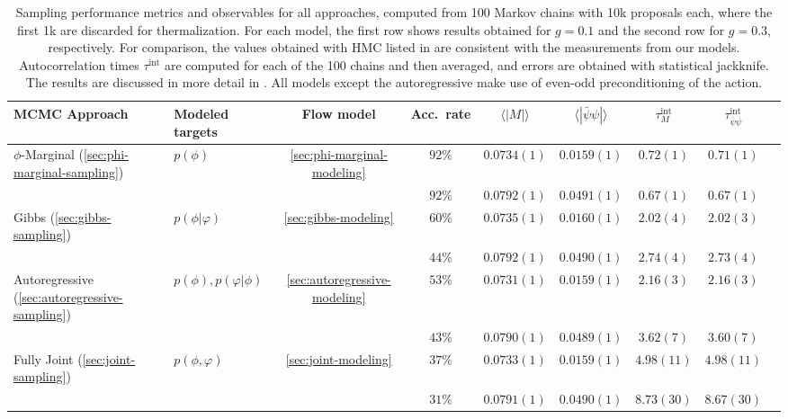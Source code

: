 \documentclass[aps,prd,twocolumn,nofootinbib,superscriptaddress,preprintnumbers]{revtex4-1}
\begin{document}
\begin{table}
    \centering
    \begin{ruledtabular}
    \begin{tabular}{m{1.3in}>{\centering\arraybackslash}p{1.0in}ccccccc}
         MCMC Approach & Modeled targets & Flow model & Acc.\ rate & $\langle|M|\rangle$ & $\langle|\bar\psi \psi|\rangle$ & $\tau^{\text{int}}_{M}$ & $\tau^{\text{int}}_{\bar{\psi} \psi}$ \\
    \midrule
         $\phi$-Marginal (\ref{sec:phi-marginal-sampling}) & $p(\phi)$ & \ref{sec:phi-marginal-modeling} & $92\%$ & $0.0734(1)$ & $0.0159(1)$ & $0.72(1)$ & $0.71(1)$ \\
         & & & $92\%$ & $0.0792(1)$ & $0.0491(1)$ & $0.67(1)$ & $0.67(1)$ \\ \vspace{1ex}
         Gibbs (\ref{sec:gibbs-sampling}) & $p(\phi|\varphi)$ & \ref{sec:gibbs-modeling} & $60\%$ & $0.0735(1)$ & $0.0160(1)$ & $2.02(4)$ & $2.02(3)$ \\
         & & & $44\%$ & $0.0792(1)$ & $0.0490(1)$ & $2.74(4)$ & $2.73(4)$ \\ \vspace{1ex}
         Autoregressive (\ref{sec:autoregressive-sampling}) & $p(\phi), p(\varphi|\phi)$ & \ref{sec:autoregressive-modeling} & $53\%$ & $0.0731(1)$ & $0.0159(1)$ & $2.16(3)$ & $2.16(3)$  \\
         & & & $43\%$ & $0.0790(1)$ & $0.0489(1)$ & $3.62(7)$ & $3.60(7)$ \\ \vspace{1ex}
         Fully Joint (\ref{sec:joint-sampling}) & $p(\phi,\varphi)$ & \ref{sec:joint-modeling} & $37\%$ & $0.0733(1)$ & $0.0159(1)$ & $4.98(11)$ & $4.98(11)$ \\
         & & & $31\%$ & $0.0791(1)$ & $0.0490(1)$ & $8.73(30)$ & $8.67(30)$ \\
    \end{tabular}
    \end{ruledtabular}
    \caption{Sampling performance metrics and observables for all approaches, computed from 100 Markov chains with 10k proposals each, where the first 1k are discarded for thermalization. For each model, the first row shows results obtained for $g = 0.1$ and the second row for $g = 0.3$, respectively. For comparison, the values obtained with HMC listed in  are consistent with the measurements from our models. Autocorrelation times $\tau^{\text{int}}$ are computed for each of the 100 chains and then averaged, and errors are obtained with statistical jackknife. The results are discussed in more detail in . All models except the autoregressive make use of even-odd preconditioning of the action.}
    \label{tab:model-metrics}
\end{table}
\end{document}
